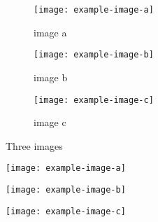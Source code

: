\begin{figure}[H]
     \centering
     \begin{subfigure}[b]{0.3\textwidth}
         \centering
         \texttt{[image: example-image-a]}
         \caption{image a}
         \label{fig: style 1 image a}
     \end{subfigure}
     \hfill
     \begin{subfigure}[b]{0.3\textwidth}
         \centering
         \texttt{[image: example-image-b]}
         \caption{image b}
         \label{fig: style 1 image b}
     \end{subfigure}
     \hfill
     \begin{subfigure}[b]{0.3\textwidth}
         \centering
         \texttt{[image: example-image-c]}
         \caption{image c}
         \label{fig: style 1 image c}
     \end{subfigure}
        \caption{Three images}
        \label{fig: three images}
\end{figure}

\begin{figure}[H]
\centering
\begin{minipage}{0.3\textwidth}
  \centering
  \texttt{[image: example-image-a]}
  \label{fig: style 2 image a}
\end{minipage}
\hfill
\begin{minipage}{0.3\textwidth}
  \centering
  \texttt{[image: example-image-b]}
  \label{fig: style 2 image b}
\end{minipage}
\hfill
\begin{minipage}{0.3\textwidth}
  \centering
  \texttt{[image: example-image-c]}
  \label{fig: style 2 image c}
\end{minipage}
\end{figure}